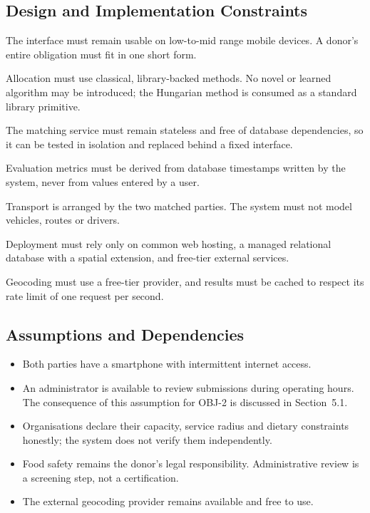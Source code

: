 \documentclass[11pt,a4paper]{article}
\begin{document}
\subsection{Design and Implementation Constraints}
\begin{description}[leftmargin=1.9cm,style=nextline,font=\normalfont\bfseries]
  \item[CON-1] The interface must remain usable on low-to-mid range mobile
    devices. A donor's entire obligation must fit in one short form.
  \item[CON-2] Allocation must use classical, library-backed methods. No novel or
    learned algorithm may be introduced; the Hungarian method is consumed as a
    standard library primitive.
  \item[CON-3] The matching service must remain stateless and free of database
    dependencies, so it can be tested in isolation and replaced behind a fixed
    interface.
  \item[CON-4] Evaluation metrics must be derived from database timestamps
    written by the system, never from values entered by a user.
  \item[CON-5] Transport is arranged by the two matched parties. The system must
    not model vehicles, routes or drivers.
  \item[CON-6] Deployment must rely only on common web hosting, a managed
    relational database with a spatial extension, and free-tier external
    services.
  \item[CON-7] Geocoding must use a free-tier provider, and results must be
    cached to respect its rate limit of one request per second.
\end{description}

\subsection{Assumptions and Dependencies}
\begin{itemize}
  \item Both parties have a smartphone with intermittent internet access.
  \item An administrator is available to review submissions during operating
    hours. The consequence of this assumption for OBJ-2 is discussed in
    Section~5.1.
  \item Organisations declare their capacity, service radius and dietary
    constraints honestly; the system does not verify them independently.
  \item Food safety remains the donor's legal responsibility. Administrative
    review is a screening step, not a certification.
  \item The external geocoding provider remains available and free to use.
\end{itemize}
\end{document}
